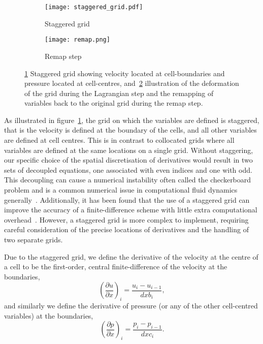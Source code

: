 \begin{figure}[t]
    \hfill
    \begin{subfigure}{0.3\textwidth}
      \centering
      \texttt{[image: staggered\_grid.pdf]}
      \caption{Staggered grid}%
      \label{fig:staggered_grid}
    \end{subfigure}
    \hfill
    \begin{subfigure}{0.49\textwidth}
      \texttt{[image: remap.png]}
      \caption{Remap step}%
      \label{fig:remap}
    \end{subfigure}
    \caption{\ref{fig:staggered_grid} Staggered grid showing velocity located at cell-boundaries and pressure located at cell-centres, and~\ref{fig:remap} illustration of the deformation of the grid during the Lagrangian step and the remapping of variables back to the original grid during the remap step.}
\label{fig:grid_and_remap}%
\end{figure}

As illustrated in figure~\ref{fig:staggered_grid}, the grid on which the variables are defined is staggered, that is the velocity is defined at the boundary of the cells, and all other variables are defined at cell centres. This is in contrast to collocated grids where all variables are defined at the same locations on a single grid. Without staggering, our specific choice of the spatial discretisation of derivatives would result in two sets of decoupled equations, one associated with even indices and one with odd. This decoupling can cause a numerical instability often called the checkerboard problem and is a common numerical issue in computational fluid dynamics generally~\cite{ferzigerComputationalMethodsFluid2002}. Additionally, it has been found that the use of a staggered grid can improve the accuracy of a finite-difference scheme with little extra computational overhead~\cite{rojanaratanangkulePerformanceHighOrder2015}. However, a staggered grid is more complex to implement, requiring careful consideration of the precise locations of derivatives and the handling of two separate grids. 

Due to the staggered grid, we define the derivative of the velocity at the centre of a cell to be the first-order, central finite-difference of the velocity at the boundaries,
\begin{equation}
  {\left( \frac{\partial u}{\partial x} \right)}_i = \frac{u_i - u_{i-1}}{dxb_i},
  \label{}
\end{equation}
and similarly we define the derivative of pressure (or any of the other cell-centred variables) at the boundaries,
\begin{equation}
  {\left( \frac{\partial p}{\partial x} \right)}_i = \frac{p_i - p_{i-1}}{dxc_i}.
  \label{}
\end{equation}

